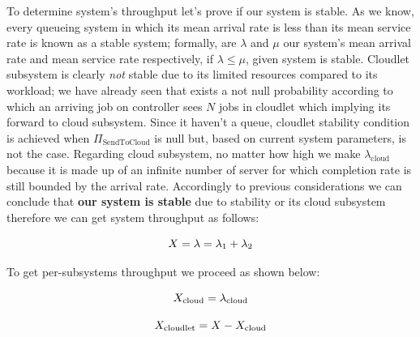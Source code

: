 \documentclass[10pt,a4paper]{article}
\begin{document}
To determine system's throughput let's prove if our system is stable.
As we know, every queueing system in which its mean arrival rate is less than its mean service rate is known as a stable system; formally, are $\lambda$ and $\mu$ our system's mean arrival rate and mean service rate respectively, if $\lambda \leq \mu$, given system is stable.
Cloudlet subsystem is clearly \textit{not} stable due to its limited resources compared to its workload; we have already seen that exists a not null probability according to which an arriving job on controller sees $N$ jobs in cloudlet which implying its forward to cloud subsystem. Since it haven't a queue, cloudlet stability condition is achieved when $\Pi_{\text{SendToCloud}}$ is null but, based on current system parameters, is not the case.
Regarding cloud subsystem, no matter how high we make $\lambda_{\text{cloud}}$ because it is made up of an infinite number of server for which completion rate is still bounded by the arrival rate.
Accordingly to previous considerations we can conclude that \textbf{our system is stable} due to stability or its cloud subsystem therefore we can get system throughput as follows:

\begin{equation}
X = \lambda = \lambda_1 + \lambda_2 \\
\end{equation}

To get per-subsystems throughput we proceed as shown below:

\begin{equation}
X_{\text{cloud}} = \lambda_{\text{cloud}} \\
\end{equation}

\begin{equation}
X_{\text{cloudlet}} = X - X_{\text{cloud}} \\
\end{equation}







\newpage
\end{document}

